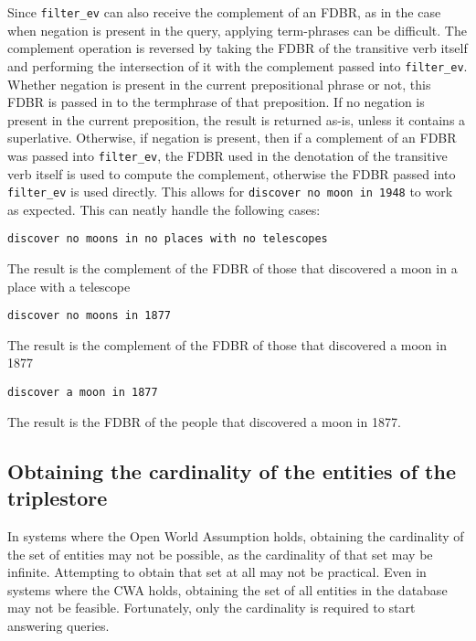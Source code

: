 \documentclass[../main.tex]{subfiles}
\begin{document}
\begin{refsection}
Since \texttt{filter\_ev} can also receive the complement of an FDBR, as in the case when negation is present in the query, applying term-phrases can be difficult.  The complement operation is reversed by taking the FDBR of the transitive verb itself and performing the intersection of it with the complement passed into \texttt{filter\_ev}.  Whether negation is present in the current prepositional phrase or not, this FDBR is passed in to the termphrase of that preposition.  If no negation is present in the current preposition, the result is returned as-is, unless it contains a superlative.  Otherwise, if negation is present, then if a complement of an FDBR was passed into \texttt{filter\_ev}, the FDBR used in the denotation of the transitive verb itself is used to compute the complement, otherwise the FDBR passed into \texttt{filter\_ev} is used directly. This allows for \texttt{discover no moon in 1948} to work as expected. This can neatly handle the following cases:

\examplespacing

\texttt{discover no moons in no places with no telescopes}

\examplespacing

\noindent The result is the complement of the FDBR of those that discovered a moon in a place with a telescope

\examplespacing

\texttt{discover no moons in 1877}

\examplespacing

\noindent The result is the complement of the FDBR of those that discovered a moon in 1877

\examplespacing

\texttt{discover a moon in 1877}

\examplespacing

\noindent The result is the FDBR of the people that discovered a moon in 1877.

\subsection{Obtaining the cardinality of the entities of the triplestore}

In systems where the Open World Assumption holds, obtaining the cardinality of the set of entities
may not be possible, as the cardinality of that set may be infinite.  Attempting to obtain that set at all may not be practical.  Even in systems where the CWA holds, obtaining the set of all entities in the database may not be feasible.  Fortunately, only the cardinality is required to start answering queries.


\end{refsection}
\end{document}
